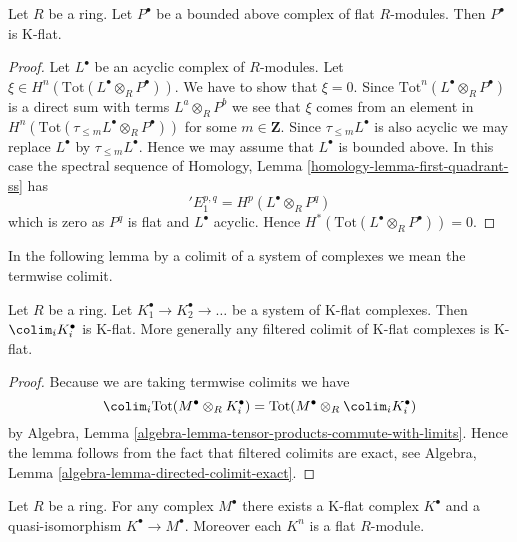 \begin{lemma}
\label{lemma-derived-tor-quasi-isomorphism}
Let $R$ be a ring. Let $P^\bullet$ be a bounded above complex of
flat $R$-modules. Then $P^\bullet$ is K-flat.
\end{lemma}

\begin{proof}
Let $L^\bullet$ be an acyclic complex of $R$-modules.
Let $\xi \in H^n(\text{Tot}(L^\bullet \otimes_R P^\bullet))$.
We have to show that $\xi = 0$.
Since $\text{Tot}^n(L^\bullet \otimes_R P^\bullet)$ is a direct
sum with terms $L^a \otimes_R P^b$ we see that $\xi$ comes from
an element in $H^n(\text{Tot}(\tau_{\leq m}L^\bullet \otimes_R P^\bullet))$
for some $m \in \mathbf{Z}$. Since $\tau_{\leq m}L^\bullet$ is also
acyclic we may replace $L^\bullet$ by $\tau_{\leq m}L^\bullet$.
Hence we may assume that $L^\bullet$ is bounded above.
In this case the spectral sequence of
Homology, Lemma \ref{homology-lemma-first-quadrant-ss}
has
$$
{}'E_1^{p, q} = H^p(L^\bullet \otimes_R P^q)
$$
which is zero as $P^q$ is flat and $L^\bullet$ acyclic. Hence
$H^*(\text{Tot}(L^\bullet \otimes_R P^\bullet)) = 0$.
\end{proof}

\noindent
In the following lemma by a colimit of a system of complexes we mean
the termwise colimit.

\begin{lemma}
\label{lemma-colimit-K-flat}
Let $R$ be a ring.
Let $K_1^\bullet \to K_2^\bullet \to \ldots$
be a system of K-flat complexes.
Then $\colim_i K_i^\bullet$ is K-flat.
More generally any filtered colimit of K-flat complexes
is K-flat.
\end{lemma}

\begin{proof}
Because we are taking termwise colimits we have
$$
\colim_i \text{Tot}(M^\bullet \otimes_R K_i^\bullet) =
\text{Tot}(M^\bullet \otimes_R \colim_i K_i^\bullet)
$$
by Algebra, Lemma \ref{algebra-lemma-tensor-products-commute-with-limits}.
Hence the lemma follows from the fact that filtered colimits are
exact, see Algebra, Lemma \ref{algebra-lemma-directed-colimit-exact}.
\end{proof}

\begin{lemma}
\label{lemma-K-flat-resolution}
Let $R$ be a ring. For any complex $M^\bullet$ there exists a
K-flat complex $K^\bullet$ and a quasi-isomorphism
$K^\bullet \to M^\bullet$. Moreover each $K^n$ is a flat $R$-module.
\end{lemma}

